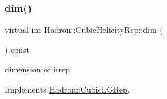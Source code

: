 \subsubsection{\texorpdfstring{dim()}{dim()}\hspace{0.1cm}{\footnotesize\ttfamily [3/3]}}
{\footnotesize\ttfamily virtual int Hadron\+::\+Cubic\+Helicity\+Rep\+::dim (\begin{DoxyParamCaption}{ }\end{DoxyParamCaption}) const\hspace{0.3cm}{\ttfamily [pure virtual]}}

dimension of irrep 

Implements \mbox{\hyperlink{structHadron_1_1CubicLGRep_a3acbaea26503ed64f20df693a48e4cdd}{Hadron\+::\+Cubic\+L\+G\+Rep}}.



